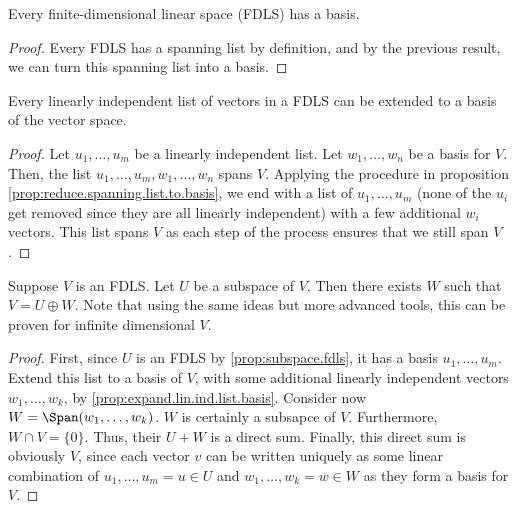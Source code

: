 \documentclass{article}
\begin{document}
  \begin{prop}
    Every finite-dimensional linear space (FDLS) has a basis.
  \end{prop}
  \begin{proof}
    Every FDLS has a spanning list by definition, and by the previous result, we can turn this spanning list into a basis.
  \end{proof}
  \begin{prop}\label{prop:expand.lin.ind.list.basis}
    Every linearly independent list of vectors in a FDLS can be extended to a basis of the vector space.
  \end{prop}
  \begin{proof}
    Let $u_1, \dots, u_m$ be a linearly independent list. Let $w_1, \dots, w_n$ be a basis for $V$. Then, the list $u_1, \dots, u_m, w_1, \dots, w_n$ spans $V$. Applying the 
    procedure in proposition \eqref{prop:reduce.spanning.list.to.basis}, we end with a list of $u_1, \dots, u_m$ (none of the $u_i$ get removed since they are all linearly
    independent) with a few additional $w_i$ vectors. This list spans $V$ as each step of the process ensures that we still span $V$.
  \end{proof}
  \begin{prop}
    Suppose $V$ is an FDLS. Let $U$ be a subspace of $V$. Then there exists $W$ such that $V = U \oplus W$. Note that using the same ideas but more advanced tools, this can be
    proven for infinite dimensional $V$.
  \end{prop}
  \begin{proof}
    First, since $U$ is an FDLS by \eqref{prop:subspace.fdls}, it has a basis $u_1, \dots, u_m$. Extend this list to a basis of $V$, with some additional linearly independent
    vectors $w_1, \dots, w_k$, by \eqref{prop:expand.lin.ind.list.basis}. Consider now $W = \Span(w_1, \dots, w_k)$. $W$ is certainly a subsapce of $V$. Furthermore, $W \cap V
    = \{0\}$. Thus, their $U + W$ is a direct sum. Finally, this direct sum is obviously $V$, since each vector $v$ can be written uniquely as some linear combination of $u_1,
    \dots, u_m = u \in U$ and $w_1, \dots, w_k = w \in W$ as they form a basis for $V$.
  \end{proof}
\end{document}
